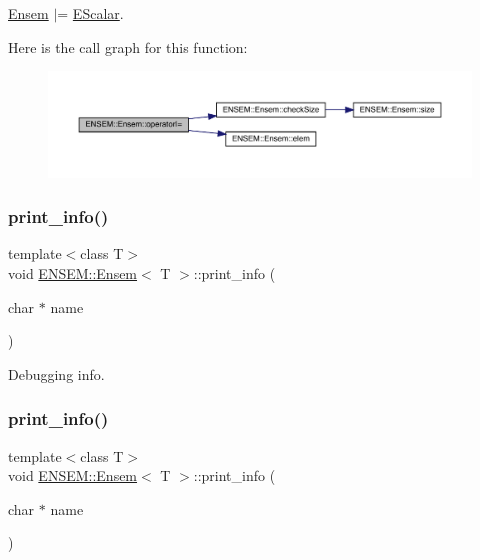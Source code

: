 \mbox{\hyperlink{classENSEM_1_1Ensem}{Ensem}} $\vert$= \mbox{\hyperlink{classENSEM_1_1EScalar}{E\+Scalar}}. 

Here is the call graph for this function\+:
\nopagebreak
\begin{figure}[H]
\begin{center}
\leavevmode
\includegraphics[width=350pt]{d7/d3e/classENSEM_1_1Ensem_aa0c3f80e393be46c6f0a1cb3bbdfb170_cgraph}
\end{center}
\end{figure}
\mbox{\label{classENSEM_1_1Ensem_a85302bace1110e35249c88486f88d80c}} 
\subsubsection{\texorpdfstring{print\_info()}{print\_info()}\hspace{0.1cm}{\footnotesize\ttfamily [1/3]}}
{\footnotesize\ttfamily template$<$class T$>$ \\
void \mbox{\hyperlink{classENSEM_1_1Ensem}{E\+N\+S\+E\+M\+::\+Ensem}}$<$ T $>$\+::print\+\_\+info (\begin{DoxyParamCaption}\item[{char $\ast$}]{name }\end{DoxyParamCaption})\hspace{0.3cm}{\ttfamily [inline]}}



Debugging info. 

\mbox{\label{classENSEM_1_1Ensem_a85302bace1110e35249c88486f88d80c}} 
\subsubsection{\texorpdfstring{print\_info()}{print\_info()}\hspace{0.1cm}{\footnotesize\ttfamily [2/3]}}
{\footnotesize\ttfamily template$<$class T$>$ \\
void \mbox{\hyperlink{classENSEM_1_1Ensem}{E\+N\+S\+E\+M\+::\+Ensem}}$<$ T $>$\+::print\+\_\+info (\begin{DoxyParamCaption}\item[{char $\ast$}]{name }\end{DoxyParamCaption})\hspace{0.3cm}{\ttfamily [inline]}}



